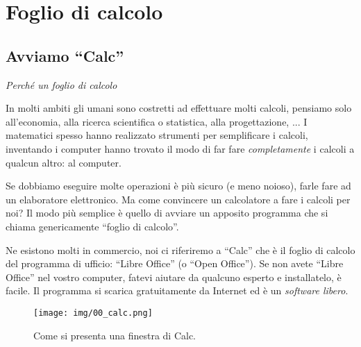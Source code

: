 
\chapter{Foglio di calcolo}

\section{Avviamo ``Calc''}

\emph{Perché un foglio di calcolo}

In molti ambiti gli umani sono costretti ad effettuare molti calcoli,
pensiamo solo all'economia, alla ricerca scientifica o statistica,
alla progettazione, ...
I matematici spesso hanno realizzato strumenti per semplificare i calcoli,
inventando i computer hanno trovato il modo di far fare \emph{completamente} i
calcoli a qualcun altro: al computer.

Se dobbiamo eseguire molte operazioni è più sicuro (e meno noioso),
farle fare ad un elaboratore elettronico. Ma come convincere un
calcolatore a fare i calcoli per noi? Il modo più semplice è quello di
avviare un apposito programma che si chiama genericamente
``foglio di calcolo''.

Ne esistono molti in commercio, noi ci riferiremo a ``Calc'' che è il
foglio di calcolo del programma di ufficio: ``Libre Office'' (o ``Open Office'').
Se non avete ``Libre Office'' nel vostro computer, fatevi aiutare da qualcuno
esperto e installatelo, è facile.
Il programma si scarica gratuitamente da Internet ed è un \emph{software libero}.

\begin{inaccessibleblock}
 \begin{figure}[htbp]
\centering
\begin{inaccessibleblock}
 \texttt{[image: img/00\_calc.png]}
\end{inaccessibleblock}
\caption{Come si presenta una finestra di Calc.}
\end{figure}
\end{inaccessibleblock}

